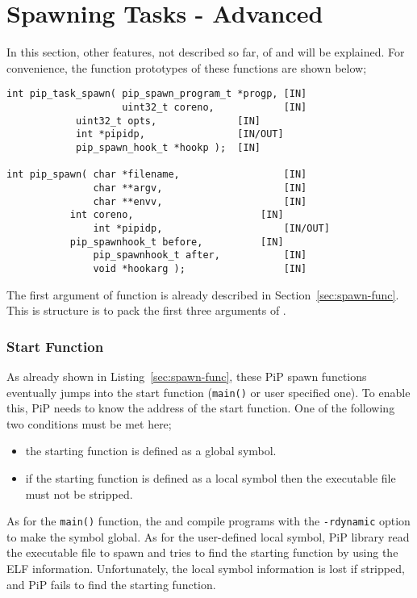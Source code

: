 
\section{Spawning Tasks - Advanced}\label{sec:spawn-adv}

In this section, other features, not described so far, of
 and  will be
explained. For convenience, the function prototypes of these functions
are shown below;

\begin{lstlisting}[frame=tb]
int pip_task_spawn( pip_spawn_program_t *progp, [IN]
                    uint32_t coreno,            [IN]
		    uint32_t opts,              [IN]
		    int *pipidp,                [IN/OUT]
		    pip_spawn_hook_t *hookp );  [IN]

int pip_spawn( char *filename,                  [IN]
               char **argv,                     [IN]
               char **envv,                     [IN]
	       int coreno,                      [IN]
               int *pipidp,                     [IN/OUT]
	       pip_spawnhook_t before,          [IN]
               pip_spawnhook_t after,           [IN]
               void *hookarg );                 [IN]
\end{lstlisting}

The first argument of  function is already
described in Section~\ref{sec:spawn-func}. This is structure is to
pack the first three arguments of . 

\subsubsection{Start Function}

As already shown in Listing~\ref{sec:spawn-func}, these PiP spawn
functions eventually jumps into the start function ({\tt main()} or
user specified one). To enable this, PiP needs to know the address of
the start function. One of the following two conditions must be
met here;

\begin{itemize}
\item the starting function is defined as a global symbol.
\item if the starting function is defined as a local symbol then the
  executable file must not be stripped.
\end{itemize}

As for the {\tt main()} function, the  and
 compile programs with the {\tt -rdynamic} option to
make the symbol global. As for the user-defined local symbol, PiP
library read the executable file to spawn and tries to find the
starting function by using the ELF information. Unfortunately, the
local symbol information is lost if stripped, and PiP fails to find
the starting function.

